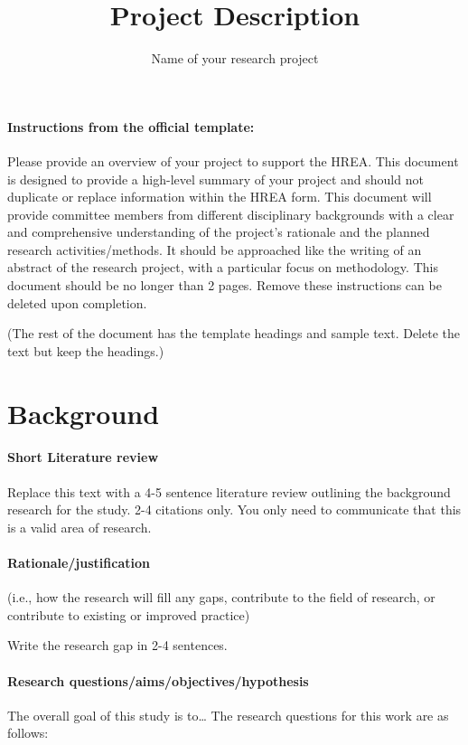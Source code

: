 \documentclass[11pt, a4paper, oneside]{article}
\title{Project Description}
\subtitle{Name of your research project}
\begin{document}
\paragraph{Instructions from the official template:}
Please provide an overview of your project to support the HREA.  This document is designed to provide a high-level summary of your project and should not duplicate or replace information within the HREA form. 
This document will provide committee members from different disciplinary backgrounds with a clear and comprehensive understanding of the project's rationale and the planned research activities/methods. It should be approached like the writing of an abstract of the research project, with a particular focus on methodology.
This document should be no longer than 2 pages. Remove these instructions can be deleted upon completion.

(The rest of the document has the template headings and sample text. Delete the text but keep the headings.)


\section{Background}

\paragraph{Short Literature review}

Replace this text with a 4-5 sentence literature review outlining the background research for the study. 2-4 citations only. You only need to communicate that this is a valid area of research.

\paragraph{Rationale/justification}

(i.e., how the research will fill any gaps, contribute to the field of research, or contribute to existing or improved practice)

Write the research gap in 2-4 sentences.

\paragraph{Research questions/aims/objectives/hypothesis}

The overall goal of this study is to\ldots 
The research questions for this work are as follows:
\end{document}
